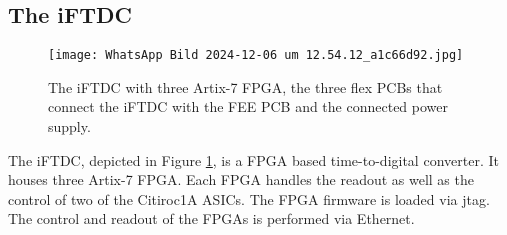 \subsection{The iFTDC}\label{sec:iFTDC}
\begin{figure}[H]
    \centering
    \texttt{[image: WhatsApp Bild 2024-12-06 um 12.54.12\_a1c66d92.jpg]}
    \caption{The iFTDC with three Artix-7 FPGA, the three flex PCBs that connect the iFTDC with the FEE PCB and the connected power supply.}
    \label{fig:iFTDC}
\end{figure}

The iFTDC, depicted in Figure \ref{fig:iFTDC}, is a FPGA based time-to-digital converter. It houses three Artix-7 FPGA.
Each FPGA handles the readout as well as the control  of two of the Citiroc1A ASICs.\autocite{InternalcommunicationIgor}
\newline
The FPGA firmware is loaded via jtag. The control and readout of the FPGAs is performed via Ethernet.









 

